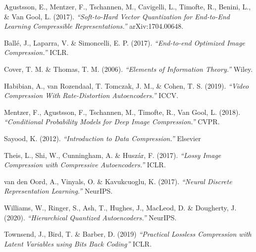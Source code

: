 \documentclass[smaller]{beamer}
\begin{document}
\begin{frame}[t]


\footnotesize

\vspace{0.5em}
Agustsson, E., Mentzer, F., Tschannen, M., Cavigelli, L., Timofte, R., Benini, L., \& Van Gool, L. (2017). \emph{``Soft-to-Hard Vector Quantization for End-to-End Learning Compressible Representations.''}  arXiv:1704.00648.

\vspace{0.5em}
Ballé, J., Laparra, V. \& Simoncelli, E. P. (2017). \emph{``End-to-end Optimized Image Compression.''} ICLR.

\vspace{0.5em}
Cover, T. M.  \& Thomas, T. M. (2006). \emph{``Elements of Information Theory.''} Wiley.

\vspace{0.5em}
Habibian, A., van Rozendaal, T. Tomczak, J. M., \& Cohen, T. S. (2019). \emph{``Video Compression With Rate-Distortion Autoencoders.''} ICCV.

\vspace{0.5em}
Mentzer, F., Agustsson, F., Tschannen, M., Timofte, R., Van Gool, L. (2018). \emph{``Conditional Probability Models for Deep Image Compression.''} CVPR.

\vspace{0.5em}
Sayood, K. (2012). \emph{``Introduction to Data Compression.''} Elsevier

\vspace{0.5em}
Theis, L., Shi, W., Cunningham, A. \& Huszár, F. (2017). \emph{``Lossy Image Compression with Compressive Autoencoders.''} ICLR.

\vspace{0.5em}
van den Oord, A., Vinyals, O. \& Kavukcuoglu, K. (2017). \emph{``Neural Discrete Representation Learning.''} NeurIPS.

\vspace{0.5em}
Williams, W., Ringer, S., Ash, T., Hughes, J., MacLeod, D. \& Dougherty, J. (2020). \emph{``Hierarchical Quantized Autoencoders.''} NeurIPS.

\vspace{0.5em}
Townsend, J., Bird, T. \& Barber, D. (2019) \emph{``Practical Lossless Compression with Latent Variables using Bits Back Coding''} ICLR.


\end{frame}
\end{document}
